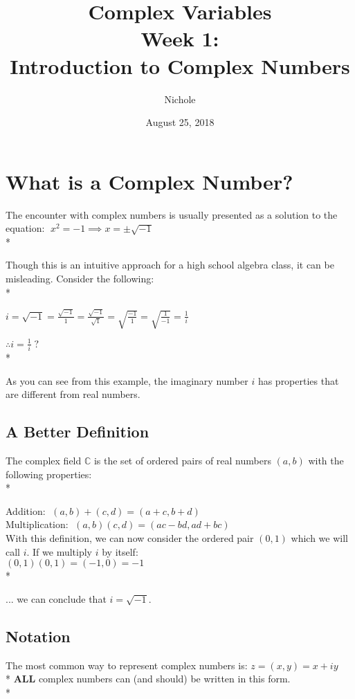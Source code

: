 \documentclass[]{article}
\title{%
	Complex Variables \\
	\large Week 1: \\
	Introduction to Complex Numbers}
\author{Nichole}
\date{August 25, 2018}
\begin{document}
\maketitle

\section{What is a Complex Number?}
	The encounter with complex numbers is usually presented as a solution to the equation: $\; x^2 = -1 \implies x=\pm\sqrt{-1}$    \\*
	
	\noindent Though this is an intuitive approach for a high school algebra class, it can be misleading. Consider the following: \\* 
	
	\indent \indent $i=\sqrt{-1}=\frac{\sqrt{-1}}{1}=\frac{\sqrt{-1}}{\sqrt{1}}=\sqrt{\frac{-1}{1}}=\sqrt{\frac{1}{-1}}=\frac{1}{i}$
	
	\indent \indent $\therefore i=\frac{1}{i} \; ? $ \\* 
	
	\noindent As you can see from this example, the imaginary number $i$ has properties that are different from real numbers.
	
	\subsection{A Better Definition}
	The complex field $\mathbb{C}$ is the set of ordered pairs of real numbers $(a,b)$ with the following properties: \\* 
	
	\indent \indent Addition: $\; (a,b)+(c,d)=(a+c,b+d)$ \\ 
	\indent \indent Multiplication: $\; (a,b)(c,d)=(ac-bd,ad+bc)$ \\ 
	
	\noindent With this definition, we can now consider the ordered pair $(0,1)$ which we will call $i$. If we multiply $i$ by itself: \\
	
	\indent \indent $(0,1)(0,1)=(-1,0)=-1$ \\* 
	
	\noindent ... we can conclude that $i=\sqrt{-1}$.
	
	\subsection{Notation}
	    The most common way to represent complex numbers is: $z=(x,y)=x+iy$ \\*    
	    \noindent \textbf{ALL} complex numbers can (and should) be written in this form. \\* 
	    
\end{document}
